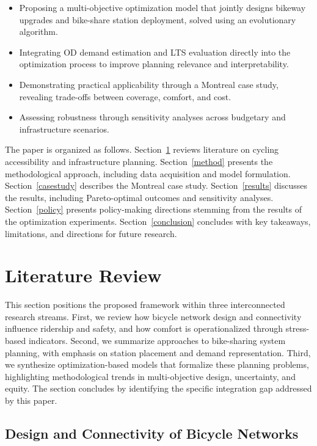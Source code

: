\documentclass[preprint,authoryear,10pt]{elsarticle}
\begin{document}
\begin{itemize}
\item Proposing a multi-objective optimization model that jointly designs bikeway upgrades and bike-share station deployment, solved using an evolutionary algorithm.
\item Integrating OD demand estimation and LTS evaluation directly into the optimization process to improve planning relevance and interpretability.
\item Demonstrating practical applicability through a Montreal case study, revealing trade-offs between coverage, comfort, and cost.
\item Assessing robustness through sensitivity analyses across budgetary and infrastructure scenarios.
\end{itemize}

The paper is organized as follows. Section~\ref{review} reviews literature on cycling accessibility and infrastructure planning. Section~\ref{method} presents the methodological approach, including data acquisition and model formulation. Section~\ref{casestudy} describes the Montreal case study. Section~\ref{results} discusses the results, including Pareto-optimal outcomes and sensitivity analyses. Section~\ref{policy} presents policy-making directions stemming from the results of the optimization experiments. Section~\ref{conclusion} concludes with key takeaways, limitations, and directions for future research.


\section{Literature Review}\label{review}

This section positions the proposed framework within three interconnected research streams. First, we review how bicycle network design and connectivity influence ridership and safety, and how comfort is operationalized through stress-based indicators. Second, we summarize approaches to bike-sharing system planning, with emphasis on station placement and demand representation. Third, we synthesize optimization-based models that formalize these planning problems, highlighting methodological trends in multi-objective design, uncertainty, and equity. The section concludes by identifying the specific integration gap addressed by this paper.

\subsection{Design and Connectivity of Bicycle Networks}
\end{document}
